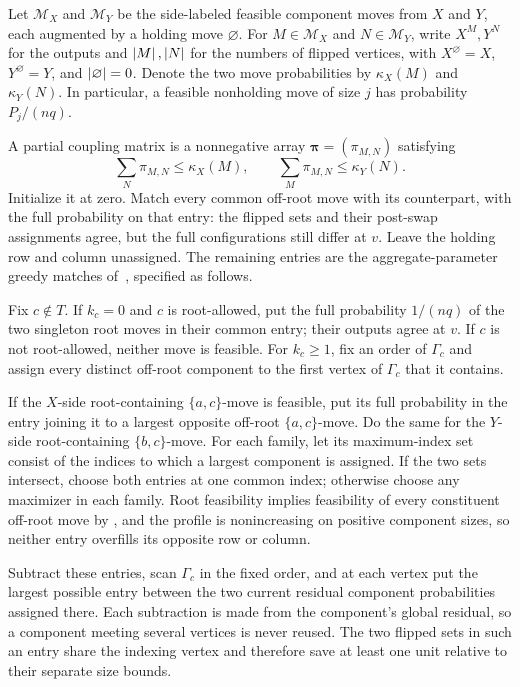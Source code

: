 \begin{definition}
\label{def:cv-component-matching}
Let \(\mathcal M_X\) and \(\mathcal M_Y\) be the side-labeled feasible
component moves from \(X\) and \(Y\), each augmented by a holding move
\(\varnothing\).  For \(M\in\mathcal M_X\) and
\(N\in\mathcal M_Y\), write \(X^M,Y^N\) for the outputs and
\(\left|M\right|,\left|N\right|\) for the numbers of flipped vertices, with
\(X^\varnothing=X\), \(Y^\varnothing=Y\), and
\(\left|\varnothing\right|=0\).  Denote the two move probabilities by
\(\kappa_X(M)\) and \(\kappa_Y(N)\).  In particular, a feasible
nonholding move of size \(j\) has probability \(P_j/(nq)\).

A partial coupling matrix is a nonnegative array
\(\boldsymbol\pi=(\pi_{M,N})\) satisfying
\[
  \sum_N\pi_{M,N}\le\kappa_X(M),
  \qquad
  \sum_M\pi_{M,N}\le\kappa_Y(N).
\]
Initialize it at zero.  Match every common off-root move with its
counterpart, with the full probability on that entry: the flipped sets
and their post-swap assignments agree, but the full configurations still
differ at \(v\).  Leave the holding row and column unassigned.  The remaining entries are the
aggregate-parameter greedy
matches of~\cite[\S5.1]{CarlsonVigoda2024}, specified as follows.

Fix \(c\notin T\).  If \(k_c=0\) and \(c\) is root-allowed, put the full
probability \(1/(nq)\) of the two singleton root moves in their common
entry; their outputs agree at \(v\).  If \(c\) is not root-allowed,
neither move is feasible.  For \(k_c\ge1\), fix an order of
\(\Gamma_c\) and assign every distinct off-root component to the first
vertex of \(\Gamma_c\) that it contains.

If the \(X\)-side root-containing \(\{a,c\}\)-move is feasible, put its
full probability in the entry joining it to a largest opposite off-root
\(\{a,c\}\)-move.  Do the same for the \(Y\)-side root-containing
\(\{b,c\}\)-move.  For each family, let its maximum-index set consist of
the indices to which a largest component is assigned.  If the two sets
intersect, choose both entries at one common index; otherwise choose any
maximizer in each family.  Root feasibility implies feasibility of every
constituent off-root move by , and the
profile is nonincreasing on positive component sizes, so neither entry
overfills its opposite row or
column.

Subtract these entries, scan \(\Gamma_c\) in the fixed order, and at each
vertex put the largest possible entry between the two current residual
component probabilities assigned there.  Each subtraction is made from the
component's global residual, so a component meeting several vertices is
never reused.  The two flipped sets in such an entry share the indexing
vertex and therefore save at least one unit relative to their separate size
bounds.


\end{definition}
